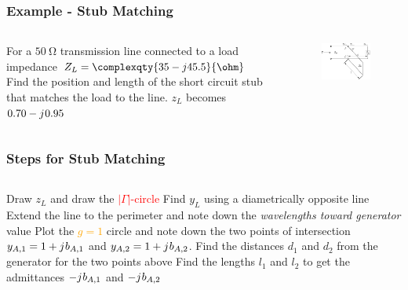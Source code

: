\documentclass[10pt, compress]{beamer}
\renewcommand{\j}{{j}\mkern1mu} %
\begin{document}
\begin{frame}
    \frametitle{Example - Stub Matching}
    \begin{columns}[]
        \begin{column}[]{.5\textwidth}
            \begin{outline}
                \1 For a $\SI{50}{\ohm}$ transmission line connected to a load impedance $Z_L = \complexqty{35 - j 45.5}{\ohm}$
                \1 Find the position and length of the short circuit stub that matches the load to the line.
                \1 $z_L$ becomes $0.70 - \j 0.95$
            \end{outline}
        \end{column}
        \begin{column}[]{.5\textwidth}
            \begin{figure}[]
                \centering
                \includegraphics[width=.9\textwidth]{tline_single_stub.pdf}
            \end{figure}
        \end{column}
    \end{columns}
\end{frame}

\begin{frame}
    \frametitle{Steps for Stub Matching}
    \begin{columns}[]
        \begin{column}[]{1\textwidth}
            \begin{outline}[enumerate]
                \1 Draw $z_L$ and draw the \textcolor{red}{$|\Gamma|$-circle}
                \1 Find $y_L$ using a diametrically  opposite line
                \1 Extend the line to the perimeter and note down the \textit{wavelengths toward generator} value
                \1 Plot the \textcolor{orange}{$g =1 $} circle and note down the two points of intersection $y_{A,1} = 1 + \j b_{A,1}$ and $y_{A,2} = 1 + \j b_{A,2}$.
                \1 Find the distances $d_1$ and $d_2$ from the generator for the two points above
                \1 Find the lengths $l_1$ and $l_2$ to get the admittances $ - \j b_{A,1}$ and $ - \j b_{A,2}$
            \end{outline}
        \end{column}
    \end{columns}
\end{frame}
\end{document}
